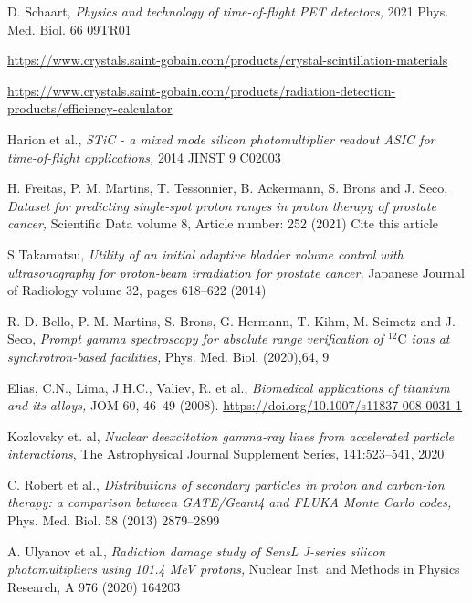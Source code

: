 \documentclass[11pt,a4paper]{article}
\begin{document}
\begin{thebibliography}{9}
D. Schaart, \emph{Physics and technology of time-of-flight PET detectors,} 2021 Phys. Med. Biol. 66 09TR01

\url{https://www.crystals.saint-gobain.com/products/crystal-scintillation-materials}

\url{https://www.crystals.saint-gobain.com/products/radiation-detection-products/efficiency-calculator}


 Harion et al., \emph{STiC - a mixed mode silicon photomultiplier readout ASIC for time-of-flight applications,} 2014 JINST 9 C02003

H. Freitas,  P. M. Martins, T. Tessonnier, B. Ackermann, S. Brons and J. Seco, \emph{Dataset for predicting single-spot proton ranges in proton therapy of prostate cancer,} Scientific Data volume 8, Article number: 252 (2021) Cite this article

S Takamatsu, \emph{Utility of an initial adaptive bladder volume control with ultrasonography for proton-beam irradiation for prostate cancer,} Japanese Journal of Radiology volume 32, pages 618–622 (2014)

R. D. Bello, P. M. Martins, S. Brons, G. Hermann, T. Kihm, M. Seimetz and J. Seco, \emph{Prompt gamma spectroscopy for absolute range verification of $\mathrm{^{12}C}$ ions at synchrotron-based facilities,} Phys. Med. Biol. (2020),64, 9

Elias, C.N., Lima, J.H.C., Valiev, R. et al.,  \emph{Biomedical applications of titanium and its alloys,}  JOM 60, 46–49 (2008). \url{https://doi.org/10.1007/s11837-008-0031-1}

 Kozlovsky et. al, \emph{Nuclear deexcitation gamma-ray lines from accelerated particle interactions}, The Astrophysical Journal Supplement Series, 141:523–541, 2020



C. Robert et al.,  \emph{Distributions of secondary particles in proton and carbon-ion therapy: a comparison between GATE/Geant4 and FLUKA Monte Carlo codes,} Phys. Med. Biol. 58 (2013) 2879–2899 


A. Ulyanov et al.,  \emph{Radiation damage study of SensL J-series silicon photomultipliers using 101.4 MeV protons,} Nuclear Inst. and Methods in Physics Research, A 976 (2020) 164203


\end{thebibliography}
\end{document}
